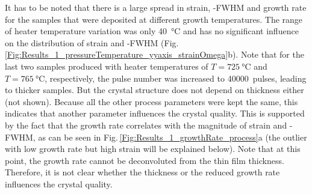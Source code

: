 It has to be noted that there is a large spread in strain, \textomega-FWHM and growth rate for the samples that were deposited at different growth temperatures.
The range of heater temperature variation was only \qty{40}{\degreeCelsius} and has no significant influence on the distribution of strain and \textomega-FWHM (Fig.\,\ref{Fig:Results_1_pressureTemperature_yyaxis_strainOmega}b).
Note that for the last two samples produced with heater temperatures of $T=\qty{725}{\degreeCelsius}$ and $T=\qty{765}{\degreeCelsius}$, respectively, the pulse number was increased to \qty{40000}{pulses}, leading to thicker samples.
But the crystal structure does not depend on thickness either (not shown).
Because all the other process parameters were kept the same, this indicates that another parameter influences the crystal quality.
This is supported by the fact that the growth rate correlates with the magnitude of strain and \textomega-FWHM, as can be seen in Fig.\,\ref{Fig:Results_1_growthRate_process}a (the outlier with low growth rate but high strain will be explained below).
Note that at this point, the growth rate cannot be deconvoluted from the thin film thickness.
Therefore, it is not clear whether the thickness or the reduced growth rate influences the crystal quality.

